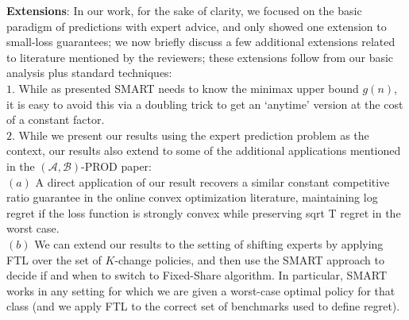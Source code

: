 \documentclass[12pt]{colt2024} %
\begin{document}
      \medskip
      \noindent\textbf{Extensions}: In our work, for the sake of clarity, we focused on the basic paradigm of predictions with expert advice, and only showed one extension to small-loss guarantees; we now briefly discuss a few additional extensions related to literature mentioned by the reviewers; these extensions follow from our basic analysis plus standard techniques:\\ 
      $1.$ While as presented SMART needs to know the minimax upper bound $g(n)$, it is easy to avoid this via a doubling trick to get an `anytime' version at the cost of a constant factor.\\
      $2.$ While we present our results using the expert prediction problem as the context, our results also extend to some of the additional applications mentioned in the $(\mathcal{A},\mathcal{B})$-PROD paper: \\
      $(a)$ A direct application of our result recovers a similar constant competitive ratio guarantee in the online convex optimization literature, maintaining log regret if the loss function is strongly convex while preserving sqrt T regret in the worst case. \\
      $(b)$ We can extend our results to the setting of shifting experts by applying FTL over the set of $K$-change policies, and then use the SMART approach to decide if and when to switch to Fixed-Share algorithm. In particular, SMART works in any setting for which we are given a worst-case optimal policy for that class (and we apply FTL to the correct set of benchmarks used to define regret). 



      
\end{document}
